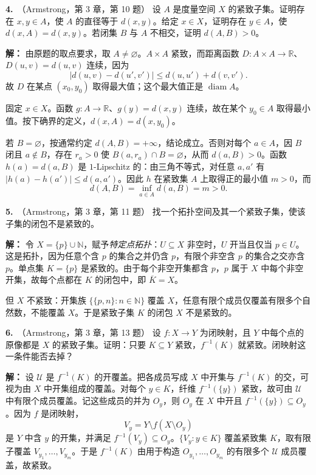 \documentclass{article}
\newcommand{\R}{\mathbb R}
\newcommand{\problem}[2]{\par\medskip\noindent\textbf{#1.}\ （#2）\quad}
\begin{document}
\problem{4}{Armstrong，第 3 章，第 10 题}
设 $A$ 是度量空间 $X$ 的紧致子集。证明存在 $x,y\in A$，使 $A$ 的直径等于 $d(x,y)$。给定 $x\in X$，证明存在 $y\in A$，使 $d(x,A)=d(x,y)$。若闭集 $B$ 与 $A$ 不相交，证明 $d(A,B)>0$。
\par\noindent\textbf{解：}
由原题的取点要求，取 $A\ne\varnothing$。$A\times A$ 紧致，而距离函数 $D:A\times A\to\R$、$D(u,v)=d(u,v)$ 连续，因为
\[
|d(u,v)-d(u',v')|\le d(u,u')+d(v,v').
\]
故 $D$ 在某点 $(x_0,y_0)$ 取得最大值；这个最大值正是 $\operatorname{diam}A$。

固定 $x\in X$。函数 $g:A\to\R$、$g(y)=d(x,y)$ 连续，故在某个 $y_0\in A$ 取得最小值。按下确界的定义，$d(x,A)=d(x,y_0)$。

若 $B=\varnothing$，按通常约定 $d(A,B)=+\infty$，结论成立。否则对每个 $a\in A$，因 $B$ 闭且 $a\notin B$，存在 $r_a>0$ 使 $B(a,r_a)\cap B=\varnothing$，从而 $d(a,B)>0$。函数 $h(a)=d(a,B)$ 是 $1$-Lipschitz 的：由三角不等式，对任意 $a,a'$ 有 $|h(a)-h(a')|\le d(a,a')$。因此 $h$ 在紧致集 $A$ 上取得正的最小值 $m>0$，而
\[
d(A,B)=\inf_{a\in A}d(a,B)=m>0.
\]

\problem{5}{Armstrong，第 3 章，第 11 题}
找一个拓扑空间及其一个紧致子集，使该子集的闭包不是紧致的。
\par\noindent\textbf{解：}
令 $X=\{p\}\cup\mathbb N$，赋予\emph{特定点拓扑}：$U\subseteq X$ 非空时，$U$ 开当且仅当 $p\in U$。这是拓扑，因为任意个含 $p$ 的集合之并仍含 $p$，有限个非空含 $p$ 的集合之交亦含 $p$。单点集 $K=\{p\}$ 是紧致的。由于每个非空开集都含 $p$，$p$ 属于 $X$ 中每个非空开集，故每个点都在 $K$ 的闭包中，即 $\overline K=X$。

但 $X$ 不紧致：开集族 $\{\{p,n\}:n\in\mathbb N\}$ 覆盖 $X$，任意有限个成员仅覆盖有限多个自然数，不能覆盖 $X$。于是紧致子集 $K$ 的闭包 $X$ 不是紧致的。

\problem{6}{Armstrong，第 3 章，第 13 题}
设 $f:X\to Y$ 为闭映射，且 $Y$ 中每个点的原像都是 $X$ 的紧致子集。证明：只要 $K\subseteq Y$ 紧致，$f^{-1}(K)$ 就紧致。闭映射这一条件能否去掉？
\par\noindent\textbf{解：}
设 $\mathcal U$ 是 $f^{-1}(K)$ 的开覆盖。把各成员写成 $X$ 中开集与 $f^{-1}(K)$ 的交，可视为由 $X$ 中开集组成的覆盖。对每个 $y\in K$，纤维 $f^{-1}(\{y\})$ 紧致，故可由 $\mathcal U$ 中有限个成员覆盖。记这些成员的并为 $O_y$，则 $O_y$ 在 $X$ 中开且 $f^{-1}(\{y\})\subseteq O_y$。因为 $f$ 是闭映射，
\[
V_y=Y\setminus f(X\setminus O_y)
\]
是 $Y$ 中含 $y$ 的开集，并满足 $f^{-1}(V_y)\subseteq O_y$。$\{V_y:y\in K\}$ 覆盖紧致集 $K$，取有限子覆盖 $V_{y_1},\ldots,V_{y_m}$。于是 $f^{-1}(K)$ 由用于构造 $O_{y_1},\ldots,O_{y_m}$ 的有限多个 $\mathcal U$ 成员覆盖，故紧致。
\end{document}
